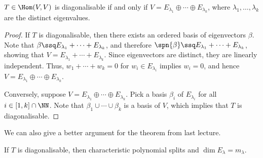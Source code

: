 \documentclass[11pt]{scrartcl}
\begin{document}
\begin{corollary}
  $T\in\Hom(V, V)$ is diagonalisable if and only if
  $V = E_{\lambda_1}\oplus\cdots\oplus E_{\lambda_k}$, where
  $\lambda_1, \dots, \lambda_k$ are the distinct eigenvalues.
\end{corollary}
\begin{proof}
  If $T$ is diagonalisable, then there exists an ordered basis of
  eigenvectors $\beta$. Note that
  $\beta\ssq E_{\lambda_1}+\cdots+E_{\lambda_k}$, and therefore
  $\spn{\beta} \ssq E_{\lambda_1}+\cdots+E_{\lambda_k}$, showing that
  $V = E_{\lambda_1}+\cdots+E_{\lambda_k}$. Since eigenvectors are
  distinct, they are linearly independent. Thus, $w_1+\cdots+w_k=0$
  for $w_i\in E_{\lambda_i}$ implies $w_i= 0$, and hence $V = E_{\lambda_1}\oplus\cdots\oplus E_{\lambda_k}$.

  Conversely, suppose
  $V = E_{\lambda_1}\oplus\cdots\oplus E_{\lambda_k}$. Pick a basis
  $\beta_{i}$ of $E_{\lambda_i}$ for all $i\in[1, k]\cap\NN$. Note
  that $\beta_1\cup\cdots\cup\beta_{k}$ is a basis of $V$, which
  implies that $T$ is diagonalisable.
\end{proof}

We can also give a better argument for the theorem from last lecture.

\begin{theorem}
  If $T$ is diagonalisable, then characteristic polynomial splits and
  $\dim E_{\lambda} = m_{\lambda}$.
\end{theorem}
\end{document}
